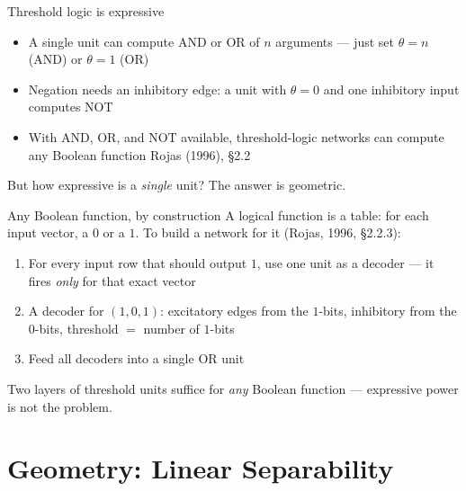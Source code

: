 \documentclass[aspectratio=169, 11pt]{beamer}
\begin{document}
\begin{frame}{Threshold logic is expressive}
  \begin{itemize}
    \item A single unit can compute AND or OR of \alert{$n$
          arguments} --- just set $\theta = n$ (AND) or
          $\theta = 1$ (OR)
    \item Negation needs an \alert{inhibitory} edge: a unit
          with $\theta = 0$ and one inhibitory input computes
          NOT
    \item With AND, OR, and NOT available, threshold-logic
          networks can compute \alert{any Boolean function}
          \hfill{\scriptsize Rojas (1996), \S2.2}
  \end{itemize}
  \vspace{0.3em}
  \begin{redhighlight}
    But how expressive is a \emph{single} unit? The answer is
    geometric.
  \end{redhighlight}
\end{frame}

\begin{frame}{Any Boolean function, by construction}
  A logical function is a \alert{table}: for each input
  vector, a $0$ or a $1$. To build a network for it
  (Rojas, 1996, \S2.2.3):
  \vspace{0.2em}
  \begin{enumerate}\setlength{\itemsep}{2pt}
    \item For every input row that should output $1$, use one
          unit as a \alert{decoder} --- it fires \emph{only}
          for that exact vector
    \item A decoder for $(1,0,1)$: excitatory edges from the
          $1$-bits, inhibitory from the $0$-bits, threshold
          $=$ number of $1$-bits
    \item Feed all decoders into a single \alert{OR} unit
  \end{enumerate}
  \vspace{0.3em}
  \begin{redhighlight}
    Two layers of threshold units suffice for \emph{any}
    Boolean function --- expressive power is not the problem.
  \end{redhighlight}
\end{frame}

\section{Geometry: Linear Separability}
\end{document}
